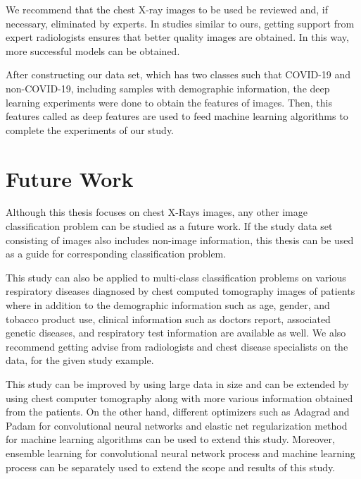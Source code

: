 We recommend that the chest X-ray images to be used be reviewed and, if necessary, eliminated by experts. In studies similar to ours, getting support from expert radiologists ensures that better quality images are obtained. In this way, more successful models can be obtained.

After constructing our data set, which has two classes such that COVID-19 and non-COVID-19, including samples with demographic information, the deep learning experiments were done to obtain the features of images. Then, this features called as deep features are used to feed machine learning algorithms to complete the experiments of our study.

\section{Future Work}

Although this thesis focuses on chest X-Rays images, any other image classification problem can be studied as a future work. If the study data set consisting of images also includes non-image information, this thesis can be used as a guide for corresponding classification problem.

This study can also be applied to multi-class classification problems on various respiratory diseases diagnosed by chest computed tomography images of patients where in addition to the demographic information such as age, gender, and tobacco product use, clinical information such as doctors report,  associated genetic diseases, and respiratory test information are available as well. We also recommend getting advise from radiologists and chest disease specialists on the data, for the given study example.

This study can be improved by using large data in size and can be extended by using chest computer tomography along with more various information obtained from the patients. On the other hand, different optimizers such as Adagrad \cite{adagrad} and Padam \cite{padam} for convolutional neural networks and elastic net regularization method \cite{elasticnet_paper} for machine learning algorithms can be used to extend this study. Moreover, ensemble learning \cite{ensemble_learning} for convolutional neural network process and machine learning process can be separately used to extend the scope and results of this study.